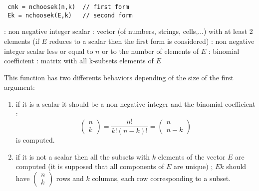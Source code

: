 
\begin{mandesc}
\end{mandesc}

\begin{calling_sequence}
\begin{verbatim}
 cnk = nchoosek(n,k)  // first form
 Ek = nchoosek(E,k)   // second form
\end{verbatim}
\end{calling_sequence}

\begin{parameters}
  \begin{varlist}
   : non negative integer scalar
   : vector (of numbers, strings, cells,...) with at least 2 elements (if $E$ reduces to a 
              scalar then the first form is considered)
   : non negative integer scalar less or equal to $n$ or to the number of elements of $E$
   : binomial coefficient
   : matrix with all k-subsets elements of $E$
  \end{varlist}
\end{parameters}

\begin{mandescription}
  This function has two differents behaviors depending of the size of the first argument:
\begin{enumerate}
\item if it is a scalar it should be a non negative integer and the binomial coefficient :
$$
  \left( \begin{array}{c} n \\ k \end{array} \right) = \frac{n!}{k!(n-k)!} =  \left( \begin{array}{c} n \\ n-k \end{array} \right)
$$
is computed.
\item if it is not a scalar then all the subsets with $k$ elements of the vector $E$ are computed
      (it is supposed that all components of $E$ are unique) ; $Ek$ should have 
      $ \left( \begin{array}{c} n \\ k \end{array} \right)$ rows and $k$ columns, each
      row corresponding to a subset.
\end{enumerate}

\end{mandescription}

